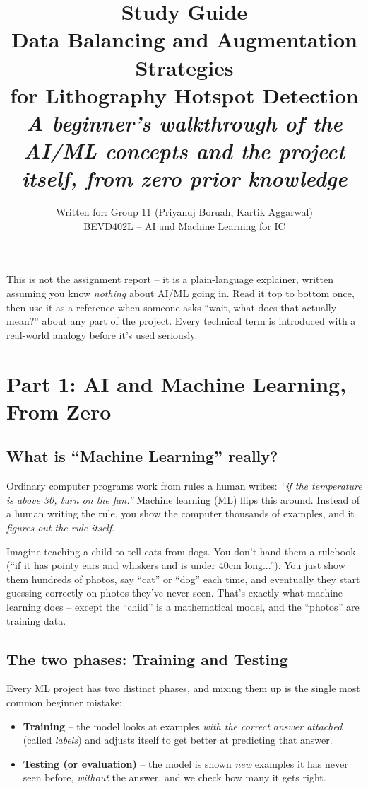 \documentclass[11pt]{article}
\title{\vspace{-1.5cm}\textbf{\color{navy}\Huge Study Guide}\\[0.3cm]
\Large Data Balancing and Augmentation Strategies\\ for Lithography Hotspot Detection\\[0.3cm]
\normalsize\itshape A beginner's walkthrough of the AI/ML concepts and the project itself, from zero prior knowledge}
\author{Written for: Group 11 (Priyanuj Boruah, Kartik Aggarwal)\\ \small BEVD402L -- AI and Machine Learning for IC}
\date{}
\begin{document}
\maketitle
\thispagestyle{empty}

\begin{keyidea}
This is not the assignment report -- it is a plain-language explainer,
written assuming you know \emph{nothing} about AI/ML going in. Read it
top to bottom once, then use it as a reference when someone asks
``wait, what does that actually mean?'' about any part of the project.
Every technical term is introduced with a real-world analogy before
it's used seriously.
\end{keyidea}

\newpage
\tableofcontents
\newpage

\section{Part 1: AI and Machine Learning, From Zero}

\subsection{What is ``Machine Learning'' really?}
Ordinary computer programs work from rules a human writes: \emph{``if
the temperature is above 30, turn on the fan.''} Machine learning (ML)
flips this around. Instead of a human writing the rule, you show the
computer thousands of examples, and it \emph{figures out the rule
itself}.

\begin{analogy}
Imagine teaching a child to tell cats from dogs. You don't hand them a
rulebook (``if it has pointy ears and whiskers and is under 40cm
long...''). You just show them hundreds of photos, say ``cat'' or
``dog'' each time, and eventually they start guessing correctly on
photos they've never seen. That's exactly what machine learning does
-- except the ``child'' is a mathematical model, and the ``photos''
are training data.
\end{analogy}

\subsection{The two phases: Training and Testing}
Every ML project has two distinct phases, and mixing them up is the
single most common beginner mistake:

\begin{itemize}[leftmargin=1.2em]
    \item \textbf{Training} -- the model looks at examples \emph{with
    the correct answer attached} (called \emph{labels}) and adjusts
    itself to get better at predicting that answer.
    \item \textbf{Testing (or evaluation)} -- the model is shown
    \emph{new} examples it has never seen before, \emph{without} the
    answer, and we check how many it gets right.
\end{itemize}
\end{document}
